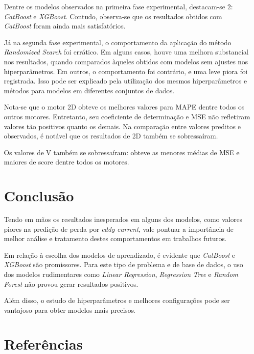 \documentclass{article}
\begin{document}
Dentre os modelos observados na primeira fase experimental, destacam-se 2: \textit{CatBoost} e \textit{XGBoost}. Contudo, observa-se que os resultados obtidos com \textit{CatBoost} foram ainda mais satisfatórios.

Já na segunda fase experimental, o comportamento da aplicação do método \textit{Randomized Search} foi errático. Em alguns casos, houve uma melhora substancial nos resultados, quando comparados àqueles obtidos com modelos sem ajustes nos hiperparâmetros. Em outros, o comportamento foi contrário, e uma leve piora foi registrada. Isso pode ser explicado pela utilização dos mesmos hiperparâmetros e métodos para modelos em diferentes conjuntos de dados.

Nota-se que o motor 2D obteve os melhores valores para MAPE dentre todos os outros motores. Entretanto, seu coeficiente de determinação e MSE não refletiram valores tão positivos quanto os demais. Na comparação entre valores preditos e observados, é notável que os resultados de 2D também se sobressaíram.

Os valores de V também se sobressaíram: obteve as menores médias de MSE e maiores de score dentre todos os motores.

\section{Conclusão}

Tendo em mãos os resultados inesperados em alguns dos modelos, como valores piores na predição de perda por \textit{eddy current}, vale pontuar a importância de melhor análise e tratamento destes comportamentos em trabalhos futuros.

Em relação à escolha dos modelos de aprendizado, é evidente que \textit{CatBoost} e \textit{XGBoost} são promissores. Para este tipo de problema e de base de dados, o uso dos modelos rudimentares como \textit{Linear Regression}, \textit{Regression Tree} e \textit{Random Forest} não provou gerar resultados positivos.

Além disso, o estudo de hiperparâmetros e melhores configurações pode ser vantajoso para obter modelos mais precisos.

\newpage
\section{Referências}
\end{document}
